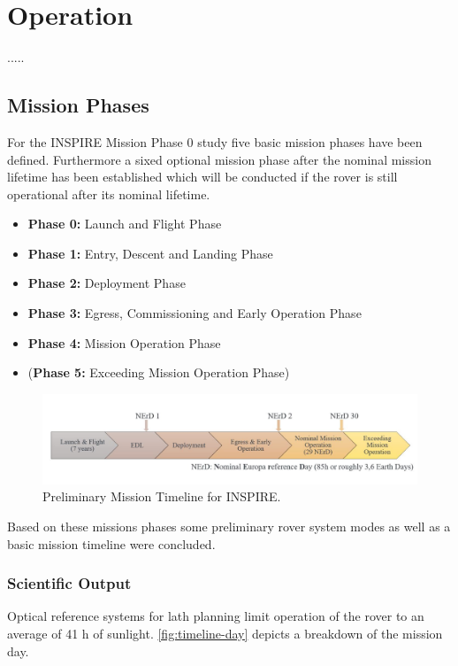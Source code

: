 \chapter{Operation}
\label{chap:Operation}
.....

\section{Mission Phases}
For the INSPIRE Mission Phase 0 study five basic mission phases have been defined. Furthermore a sixed optional mission phase after the nominal mission lifetime has been established which will be conducted if the rover is still operational after its nominal lifetime.

\begin{itemize}
\itemsep0pt
\item	\textbf{Phase 0:} Launch and Flight Phase
\item	\textbf{Phase 1:} Entry, Descent and Landing Phase
\item	\textbf{Phase 2:} Deployment Phase
\item	\textbf{Phase 3:} Egress, Commissioning and Early Operation Phase
\item	\textbf{Phase 4:} Mission Operation Phase
\item	(\textbf{Phase 5:} Exceeding Mission Operation Phase) 
\end{itemize}

\begin{figure}[H]
{\centering
\includegraphics[width=1.0\textwidth]{Media/timeline}
\caption{Preliminary Mission Timeline for INSPIRE.}
\label{fig:timeline}
}
\end{figure}

Based on these missions phases some preliminary rover system modes as well as a basic mission timeline were concluded.

\subsection{Scientific Output}
\label{chap:sc-output}

Optical reference systems for lath planning limit operation of the rover to an average of 41 h of sunlight. \autoref{fig:timeline-day} depicts a breakdown of the mission day. \\

